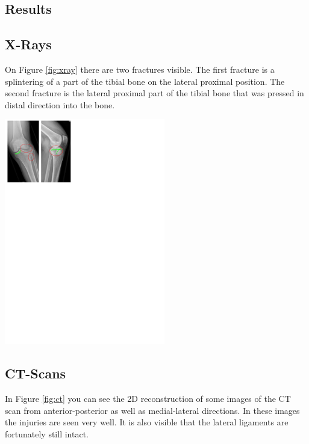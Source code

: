 \documentclass[a4paper]{article}
\newenvironment{Figure}
	{\par\medskip\noindent\minipage{\linewidth}}
	{\endminipage\par\medskip}
\begin{document}
\begin{multicols*}{2}
		\section{Results}
			\subsection{X-Rays}
				On Figure \ref{fig:xray} there are two fractures visible. The first fracture is a splintering of a part
				of the tibial bone on the lateral proximal position. The second fracture is the lateral proximal part
				of the tibial bone that was pressed in distal direction into the bone.
			
				\begin{Figure}
					\centering
					\includegraphics[trim={0.5cm 21.3cm 12.3cm 0},clip,width=7cm]{images/figure1_xray_knee.pdf}
					\label{fig:xray}
				\end{Figure}
			
			\subsection{CT-Scans}
				In Figure \ref{fig:ct} you can see the 2D reconstruction of some images of the CT scan from
				anterior-posterior as well as medial-lateral directions. In these images the injuries are seen
				very well. It is also visible that the lateral ligaments are fortunately still intact.
			

\end{multicols*}
\end{document}
